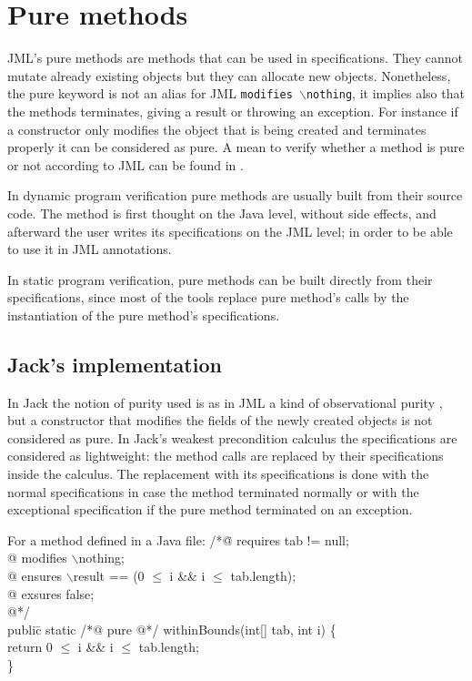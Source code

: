 \section{Pure methods}
JML's pure methods are methods that can be used in specifications.
They cannot mutate already existing objects but they can allocate new objects.
Nonetheless, the pure keyword is not an alias for JML {\tt modifies $\backslash$nothing}, 
it implies also that the methods terminates, giving a result or throwing an 
exception.
For instance if a constructor only modifies the object that is being 
created and terminates properly
it can be considered as pure.
A mean to verify whether a method is pure or not according to JML
can be found in \cite{salcianu05}. 



In dynamic program verification pure methods are usually built from 
their source code. 
The method is first thought on the Java level, without side effects, 
and afterward the user writes its specifications on the JML level; 
in order to be able to use it in JML annotations.

In static program verification,  pure methods can be built directly
from their specifications, since most of the tools replace pure method's calls 
 by the instantiation of the pure method's specifications.


\subsection{Jack's implementation}
In Jack the notion of purity used is as in JML a kind of observational 
purity \cite{naumann05}, but a constructor that modifies the fields 
of the newly created objects is not considered as pure.
In Jack's weakest precondition calculus the specifications are considered 
as lightweight: the method calls are replaced by their specifications 
inside the calculus.
The replacement with its specifications is done with the normal 
specifications in case the method terminated normally or with the 
exceptional specification if the pure method terminated on an exception.
 
For a method defined in a Java file: 
\btab
 /*\=@ requires tab != null;\+\\
  @  modifies $\backslash$nothing;\\
  @ ensures   $\backslash$result == (0 $\le$ i \&\& i $\le$ tab.length);\\
  @ exsures false;\\
  @*/\-\\
publi\=c static /*@ pure @*/  withinBounds(int[] tab, int i) \{\+\\
       return 0 $\le$ i \&\& i $\le$ tab.length;\-\\
\}
\etab

